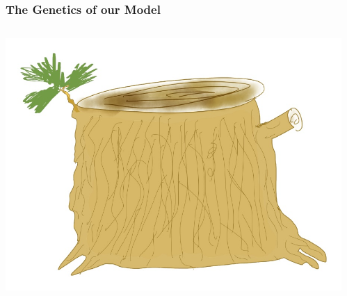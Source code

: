 \documentclass[xcolor=dvipsnames]{beamer}
\begin{document}
\begin{frame}
	\frametitle{	The Genetics of our Model }
	\begin{columns}
		\begin{column}{0.5\textwidth}
			\includegraphics[keepaspectratio, width  = \textwidth]{img/treeStump}
		\end{column}
		\begin{column}{0.6\textwidth}
		\end{column}
	\end{columns}

\end{frame}
\end{document}
